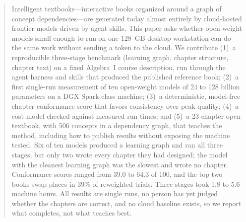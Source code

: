 \begin{abstract}
Intelligent textbooks---interactive books organized around a graph of concept dependencies---are generated today almost entirely by cloud-hosted frontier models driven by agent skills. This paper asks whether open-weight models small enough to run on one 128~GB desktop workstation can do the same work without sending a token to the cloud. We contribute (1)~a reproducible three-stage benchmark (learning graph, chapter structure, chapter text) on a fixed Algebra~I course description, run through the agent harness and skills that produced the published reference book; (2)~a first single-run measurement of ten open-weight models of 24 to 128 billion parameters on a DGX Spark-class machine; (3)~a deterministic, model-free chapter-conformance score that favors consistency over peak quality; (4)~a cost model checked against measured run times; and (5)~a 23-chapter open textbook, with 506 concepts in a dependency graph, that teaches the method, including how to publish results without exposing the machine tested. Six of ten models produced a learning graph and ran all three stages, but only two wrote every chapter they had designed; the model with the cleanest learning graph was the slowest and wrote no chapter. Conformance scores ranged from 39.0 to 64.3 of 100, and the top two books swap places in 39\% of reweighted trials. Three stages took 1.8 to 5.6 machine hours. All results are single runs, no person has yet judged whether the chapters are correct, and no cloud baseline exists, so we report what completes, not what teaches best.
\end{abstract}
